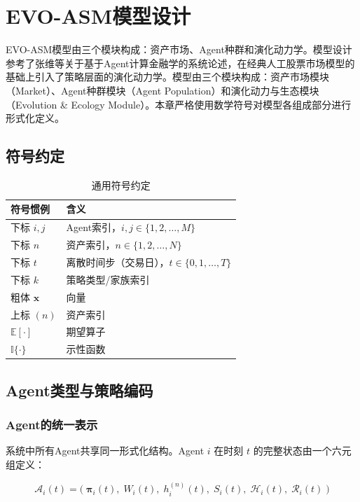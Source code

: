 ﻿\chapter{EVO-ASM模型设计}
\label{chap:model}

EVO-ASM模型由三个模块构成：资产市场、Agent种群和演化动力学。模型设计参考了张维等\cite{zhangwei2013}关于基于Agent计算金融学的系统论述，在经典人工股票市场模型的基础上引入了策略层面的演化动力学。模型由三个模块构成：资产市场模块（Market）、Agent种群模块（Agent Population）和演化动力与生态模块（Evolution \& Ecology Module）。本章严格使用数学符号对模型各组成部分进行形式化定义。

\section{符号约定}

\begin{table}[htb]
\centering
\caption{通用符号约定}
\label{tab:notation}
\begin{tabular}{@{}ll@{}}
\toprule
符号惯例 & 含义 \\
\midrule
下标 $i, j$ & Agent索引，$i, j \in \{1, 2, \ldots, M\}$ \\
下标 $n$ & 资产索引，$n \in \{1, 2, \ldots, N\}$ \\
下标 $t$ & 离散时间步（交易日），$t \in \{0, 1, \ldots, T\}$ \\
下标 $k$ & 策略类型/家族索引 \\
粗体 $\mathbf{x}$ & 向量 \\
上标 $(n)$ & 资产索引 \\
$\mathbb{E}[\cdot]$ & 期望算子 \\
$\mathbb{I}\{\cdot\}$ & 示性函数 \\
\bottomrule
\end{tabular}
\end{table}

\section{Agent类型与策略编码}

\subsection{Agent的统一表示}

系统中所有Agent共享同一形式化结构。Agent $i$ 在时刻 $t$ 的完整状态由一个六元组定义：

\begin{equation}
\boxed{\mathcal{A}_i(t) = \bigl(\; \boldsymbol{\pi}_i(t),\; W_i(t),\; h_i^{(n)}(t),\; S_i(t),\; \mathcal{H}_i(t),\; \mathcal{R}_i(t) \;\bigr)}
\label{eq:agent_state}
\end{equation}

